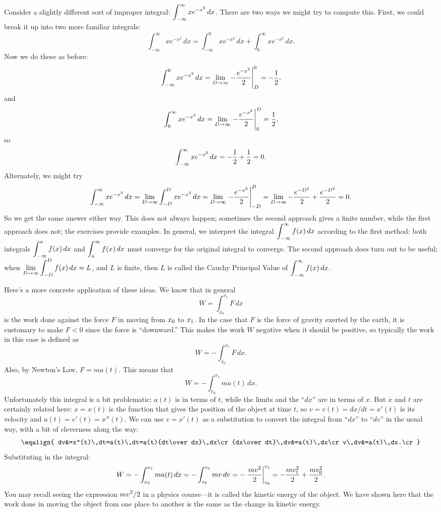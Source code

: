 Consider a slightly different sort of improper integral:
$\displaystyle \int_{-\infty}^\infty xe^{-x^2}\,dx$. There are two ways we might
try to compute this. First, we could break it up into two more
familiar integrals:
$$
  \int_{-\infty}^\infty xe^{-x^2}\,dx=
  \int_{-\infty}^0 xe^{-x^2}\,dx+\int_{0}^\infty xe^{-x^2}\,dx.
$$
Now we do these as before:
$$
  \int_{-\infty}^0 xe^{-x^2}\,dx=\lim_{D\to\infty}
  \left.-{e^{-x^2}\over2}\right|_D^0=-{1\over2},
$$
and
$$
  \int_0^\infty xe^{-x^2}\,dx=\lim_{D\to\infty}
  \left.-{e^{-x^2}\over2}\right|_0^D={1\over2},
$$
so 
$$\displaystyle \int_{-\infty}^\infty xe^{-x^2}\,dx=-{1\over2}+{1\over2}=0.$$
Alternately, we might try
$$
  \int_{-\infty}^\infty xe^{-x^2}\,dx=
  \lim_{D\to\infty}\int_{-D}^D xe^{-x^2}\,dx=
  \lim_{D\to\infty}\left.-{e^{-x^2}\over2}\right|_{-D}^D=
  \lim_{D\to\infty} -{e^{-D^2}\over2}+{e^{-D^2}\over2}=0.
$$
So we get the same answer either way. This does not always happen;
sometimes the second approach gives a finite number, while the first
approach does not; the exercises provide examples. In general, we
interpret the integral $\displaystyle\int_{-\infty}^\infty f(x)\,dx$ according
to the first method: both integrals $\displaystyle\int_{-\infty}^a
f(x)\,dx$ and $\displaystyle\int_{a}^\infty f(x)\,dx$ must converge for the
original integral to converge. The second approach does turn out to be
useful; when $\displaystyle\lim_{D\to\infty}\int_{-D}^D f(x)\,dx=L$, and $L$ is
finite, then $L$ is called the 
{\dfont Cauchy Principal Value\/} of
$\displaystyle\int_{-\infty}^\infty f(x)\,dx$.

Here's a more concrete application of these ideas. We know that
in general
$$W=\int_{x_0}^{x_1} F\,dx$$ 
is the work done against the force $F$ in moving from $\displaystyle x_0$ to
$\displaystyle x_1$. In the case that $F$ is the force of gravity exerted by the
earth, it is customary to make $F<0$ since the force is ``downward.''
This makes the work $W$ negative when it should be positive, so
typically the work in this case is defined as
$$W=-\int_{x_0}^{x_1} F\,dx.$$
Also, by Newton's Law, $F=ma(t)$. This means that 
$$W=-\int_{x_0}^{x_1} ma(t)\,dx.$$
Unfortunately this integral is a bit problematic: $a(t)$ is in terms
of $t$, while the limits and the ``$dx$'' are in terms of $x$. But $x$
and $t$ are certainly related here: $x=x(t)$ is the function that
gives the position of the object at time $t$, so $v=v(t)=dx/dt=x'(t)$
is its velocity and $a(t)=v'(t)=x''(t)$. We can use $v=x'(t)$ as a
substitution to convert the integral from ``$dx$'' to ``$dv$'' in the
usual way, with a bit of cleverness along the way:
$$\eqalign{
  dv&=x''(t)\,dt=a(t)\,dt=a(t){dt\over dx}\,dx\cr
  {dx\over dt}\,dv&=a(t)\,dx\cr
  v\,dv&=a(t)\,dx.\cr
}$$ 
Substituting in the integral:
$$
  W=-\int_{x_0}^{x_1} ma(t)\,dx=-\int_{v_0}^{v_1} mv\,dv=
  -\left.{mv^2\over2}\right|_{v_0}^{v_1}=-{mv_1^2\over2}+{mv_0^2\over2}.
$$
You may recall seeing the expression $\displaystyle mv^2/2$ in a physics course---it
is called the {\dfont kinetic energy\/} of the
object. We have shown here that the work done in moving the object
from one place to another is the same as the change in kinetic energy.

